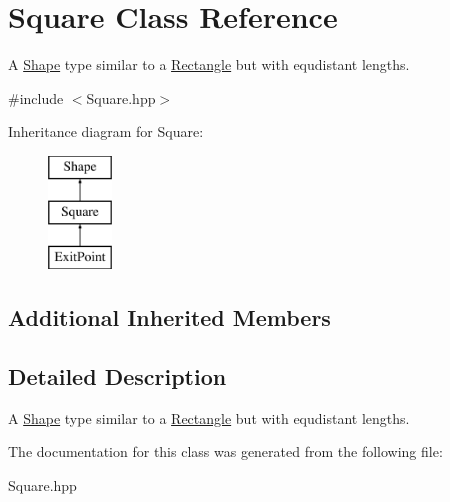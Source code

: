\hypertarget{class_square}{}\section{Square Class Reference}
\label{class_square}


A \mbox{\hyperlink{class_shape}{Shape}} type similar to a \mbox{\hyperlink{class_rectangle}{Rectangle}} but with equdistant lengths.  




{\ttfamily \#include $<$Square.\+hpp$>$}

Inheritance diagram for Square\+:\begin{figure}[H]
\begin{center}
\leavevmode
\includegraphics[height=3.000000cm]{class_square}
\end{center}
\end{figure}
\subsection*{Additional Inherited Members}


\subsection{Detailed Description}
A \mbox{\hyperlink{class_shape}{Shape}} type similar to a \mbox{\hyperlink{class_rectangle}{Rectangle}} but with equdistant lengths. 

The documentation for this class was generated from the following file\+:\begin{DoxyCompactItemize}
\item 
Square.\+hpp\end{DoxyCompactItemize}
